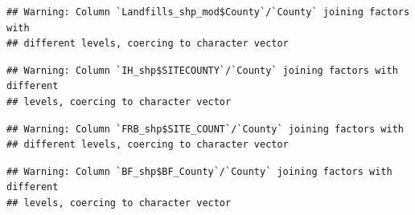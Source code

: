 \documentclass[12pt,]{article}
\newenvironment{Shaded}{\begin{snugshade}}{\end{snugshade}}
\newcommand{\KeywordTok}[1]{\textcolor[rgb]{0.13,0.29,0.53}{\textbf{#1}}}
\newcommand{\DataTypeTok}[1]{\textcolor[rgb]{0.13,0.29,0.53}{#1}}
\newcommand{\StringTok}[1]{\textcolor[rgb]{0.31,0.60,0.02}{#1}}
\newcommand{\OperatorTok}[1]{\textcolor[rgb]{0.81,0.36,0.00}{\textbf{#1}}}
\newcommand{\NormalTok}[1]{#1}
\begin{document}
\begin{verbatim}
## Warning: Column `Landfills_shp_mod$County`/`County` joining factors with
## different levels, coercing to character vector
\end{verbatim}

\begin{Shaded}
\end{Shaded}

\begin{verbatim}
## Warning: Column `IH_shp$SITECOUNTY`/`County` joining factors with different
## levels, coercing to character vector
\end{verbatim}

\begin{Shaded}
\end{Shaded}

\begin{verbatim}
## Warning: Column `FRB_shp$SITE_COUNT`/`County` joining factors with
## different levels, coercing to character vector
\end{verbatim}

\begin{Shaded}
\end{Shaded}

\begin{verbatim}
## Warning: Column `BF_shp$BF_County`/`County` joining factors with different
## levels, coercing to character vector
\end{verbatim}
\end{document}
